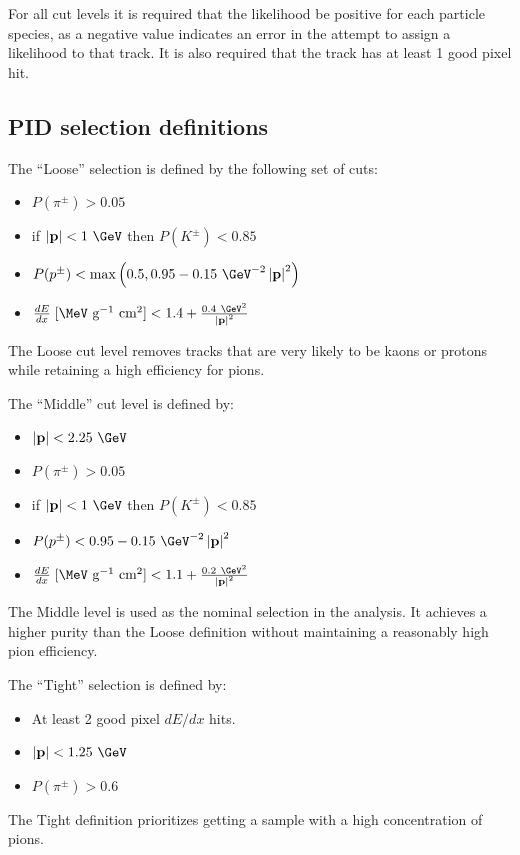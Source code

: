 For all cut levels it is required that the likelihood be positive for each particle species, as a negative value indicates an error in the attempt to assign a likelihood to that track.
It is also required that the track has at least 1 good pixel \dEdx hit.

\subsection{PID selection definitions}

The ``Loose'' selection is defined by the following set of cuts:
\begin{itemize}
  \item
    $P(\pi^{\pm}) > 0.05$
  \item
    if $\left|\mathbf{p}\right| < 1~\GeV$ then $P(K^{\pm}) < 0.85$
  \item
    $P(p^{\pm}) < \max\left(0.5, 0.95 - 0.15~\GeV^{-2}\left|\mathbf{p}\right|^{2} \right)$
  \item
    $\frac{dE}{dx} \; [\MeV \textrm{ g}^{-1} \textrm{ cm}^{2}] < 1.4 + \frac{0.4~\GeV^2}{\left|\mathbf{p}\right|^{2}}$
\end{itemize}
The Loose cut level removes tracks that are very likely to be kaons or protons while retaining a high efficiency for pions.

The ``Middle'' cut level is defined by:
\begin{itemize}
\item %
  $\left|\mathbf{p}\right| < 2.25~\GeV$
\item
  $P(\pi^{\pm}) > 0.05$
\item
  if $\left|\mathbf{p}\right| < 1~\GeV$ then $P(K^{\pm}) < 0.85$
\item
  $P(p^{\pm}) < 0.95 - 0.15~\GeV^{-2}\left|\mathbf{p}\right|^{2}$
\item
  $\frac{dE}{dx} \; [\MeV \textrm{ g}^{-1} \textrm{ cm}^{2}]< 1.1 + \frac{0.2~\GeV^2}{\left|\mathbf{p}\right|^{2}}$
\end{itemize}
The Middle level is used as the nominal selection in the analysis. It achieves a higher purity than the Loose definition without maintaining a reasonably high pion efficiency.

The ``Tight'' selection is defined by:
\begin{itemize}
\item
  At least 2 good pixel $dE/dx$ hits.
\item
  $\left|\mathbf{p}\right| < 1.25~\GeV$
\item
  $P(\pi^{\pm}) > 0.6$
\end{itemize}
The Tight definition prioritizes getting a sample with a high concentration of pions.


